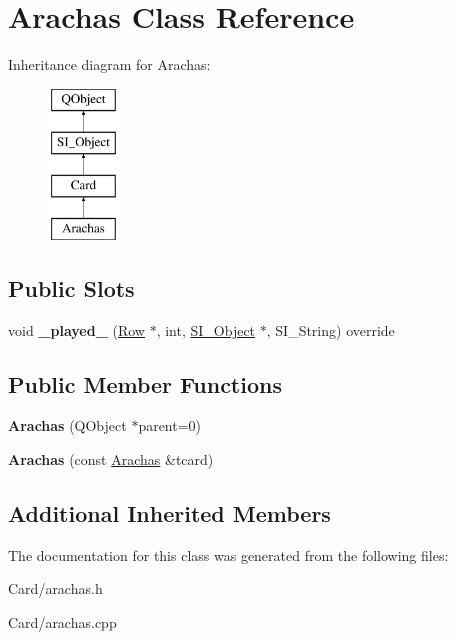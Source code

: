 \hypertarget{class_arachas}{}\section{Arachas Class Reference}
\label{class_arachas}
Inheritance diagram for Arachas\+:\begin{figure}[H]
\begin{center}
\leavevmode
\includegraphics[height=4.000000cm]{class_arachas}
\end{center}
\end{figure}
\subsection*{Public Slots}
\begin{DoxyCompactItemize}
\item 
\mbox{\label{class_arachas_ad35f57ba12cf78306194aba95cea474f}} 
void {\bfseries \+\_\+played\+\_\+} (\hyperlink{class_card_set}{Row} $\ast$, int, \hyperlink{class_s_i___object}{S\+I\+\_\+\+Object} $\ast$, S\+I\+\_\+\+String) override
\end{DoxyCompactItemize}
\subsection*{Public Member Functions}
\begin{DoxyCompactItemize}
\item 
\mbox{\label{class_arachas_a44ae29a9d8fd592c1191086fe0348de3}} 
{\bfseries Arachas} (Q\+Object $\ast$parent=0)
\item 
\mbox{\label{class_arachas_ad6484ca0f44e6e6653f5ca532e65ac38}} 
{\bfseries Arachas} (const \hyperlink{class_arachas}{Arachas} \&tcard)
\end{DoxyCompactItemize}
\subsection*{Additional Inherited Members}


The documentation for this class was generated from the following files\+:\begin{DoxyCompactItemize}
\item 
Card/arachas.\+h\item 
Card/arachas.\+cpp\end{DoxyCompactItemize}
